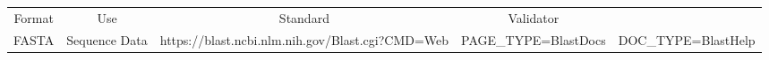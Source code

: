 \begin{tabular}{cccc}
{Format} & {Use} & {Standard} & {Validator} \\
FASTA & Sequence Data & https://blast.ncbi.nlm.nih.gov/Blast.cgi?CMD=Web&PAGE_TYPE=BlastDocs&DOC_TYPE=BlastHelp
\end{tabular}